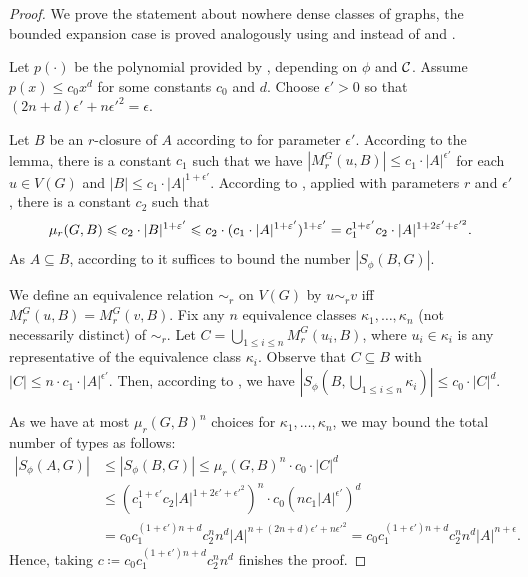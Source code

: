 \begin{proof}
We prove the statement about nowhere dense classes of graphs,
the bounded expansion case is proved analogously using  and  instead of  and .

Let $p(\cdot)$ be the polynomial provided by ,
depending on $\phi$ and $\mathcal{C}$. Assume $p(x)\leq c_0x^d$ 
for some constants $c_0$ and $d$. 
Choose $\epsilon'>0$ so that $(2n+d)\epsilon'+n\epsilon'^2=\epsilon$. 

Let $B$ be an $r$-closure of $A$ according to  for parameter $\epsilon'$. 
According to the lemma, 
there is a constant $c_1$ such that 
we have $|M_r^G(u,B)|\leq c_1\cdot |A|^{\epsilon'}$ 
for each $u\in V(G)$ and 
$|B|\leq c_1\cdot |A|^{1+\epsilon'}$. According to 
, applied
with parameters $r$ and $\epsilon'$, 
there is a constant
$c_2$ such that 
$$\mu_r(G,B)\leqslant c_2\cdot |B|^{1+\varepsilon'}\leqslant
c_2\cdot (c_1\cdot |A|^{1+\varepsilon'})^{1+\varepsilon'}=c_1^{1+\varepsilon'}c_2\cdot|A|^{1+2\varepsilon'+\varepsilon'^2}.$$
As $A\subseteq B$, 
according to  it suffices to bound the
number $|S_\phi(B,G)|$. 

We define an equivalence relation $\sim_r$ on 
$V(G)$ by $u\sim_r v$ iff 
$M_r^G(u,B)=M_r^G(v,B)$. 
Fix any $n$ equivalence
classes $\kappa_1,\ldots, \kappa_n$ (not necessarily
distinct) of $\sim_r$. Let $C=\bigcup_{1\leq i\leq n}M_r^G(u_i, B)$, 
where $u_i\in \kappa_i$ is any representative of the
equivalence class $\kappa_i$. Observe that $C\subseteq B$ with
$|C|\leq n\cdot c_1\cdot |A|^{\epsilon'}$. 
Then, according to , 
we have $|S_\phi(B,\bigcup_{1\leq i\leq n}\kappa_i)|\leq
c_0\cdot |C|^d$. 

As we have at most $\mu_r(G,B)^n$ choices for 
$\kappa_1,\ldots, \kappa_n$, we may bound the total 
number of types as follows:
\begin{align*}
|S_\phi(A,G)| & \leq |S_\phi(B,G)|\leq \mu_r(G,B)^n \cdot c_0\cdot |C|^d\\
& \leq \left(c_1^{1+\epsilon'}c_2|A|^{1+2\epsilon'+\epsilon'^2}\right)^n\cdot c_0\left(nc_1|A|^{\epsilon'}\right)^d\\
& = c_0c_1^{(1+\epsilon')n+d}c_2^nn^d|A|^{n+(2n+d)\epsilon'+n\epsilon'^2} = c_0c_1^{(1+\epsilon')n+d}c_2^nn^d|A|^{n+\epsilon}.
\end{align*}
Hence, taking $c\coloneqq c_0c_1^{(1+\epsilon')n+d}c_2^nn^d$ finishes the proof.
\end{proof}

